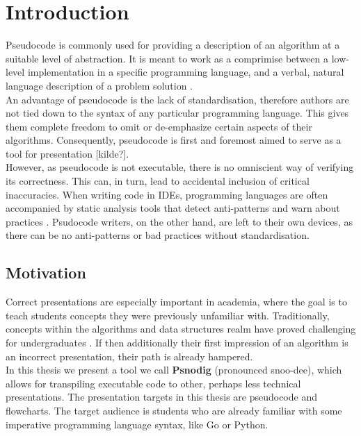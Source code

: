 \chapter{Introduction}

Pseudocode is commonly used for providing a description of an algorithm at a suitable level of abstraction. It is meant to work as a comprimise between a low-level implementation in a specific programming language, and a verbal, natural language description of a problem solution \cite{LinfoAlgorithmsIntro2007}. \hfill \\

An advantage of pseudocode is the lack of standardisation, therefore authors are not tied down to the syntax of any particular programming language. This gives them complete freedom to omit or de-emphasize certain aspects of their algorithms. Consequently, pseudocode is first and foremost aimed to serve as a tool for presentation [kilde?]. \hfill \\

However, as pseudocode is not executable, there is no omniscient way of verifying its correctness. This can, in turn, lead to accidental inclusion of critical inaccuracies. %
When writing code in IDEs, programming languages are often accompanied by static analysis tools that detect anti-patterns and warn about practices \cite{linter}. Psudocode writers, on the other hand, are left to their own devices, as there can be no anti-patterns or bad practices without standardisation.

\section{Motivation}

Correct presentations are especially important in academia, where the goal is to teach students concepts they were previously unfamiliar with. Traditionally, concepts within the algorithms and data structures realm have proved challenging for undergraduates \cite{10.1145/2157136.2157148}. If then additionally their first impression of an algorithm is an incorrect presentation, their path is already hampered. \hfill \\

In this thesis we present a tool we call \textbf{Psnodig} (pronounced snoo-dee), which allows for transpiling executable code to other, perhaps less technical presentations. The presentation targets in this thesis are pseudocode and flowcharts. The target audience is students who are already familiar with some imperative programming language syntax, like Go or Python. \hfill \\

